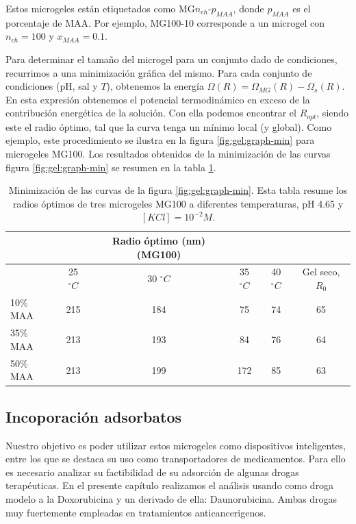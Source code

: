 Estos microgeles est\'an etiquetados como MG$n_{ch}$-$p_{MAA}$, donde $p_{MAA}$ es el porcentaje de MAA.
Por ejemplo, MG100-10 corresponde a un  microgel con $n_{ch}=100$ y $x_{MAA}=0.1$.


Para determinar el tama\~no del microgel para un conjunto dado de condiciones, recurrimos a una minimizaci\'on gr\'afica del mismo.
Para cada conjunto de condiciones (pH, sal y $T$), obtenemos la energ\'ia $\Omega(R)=\Omega_{MG}(R)-\Omega_{s}(R)$. En esta expresi\'on obtenemos el potencial termodin\'amico en exceso de la contribuci\'on energ\'etica de la soluci\'on.
Con ella podemos encontrar el $R_{opt }$, siendo este el radio \'optimo, tal que la curva tenga un m\'inimo local (y global).
Como ejemplo, este procedimiento se ilustra en la figura \ref{fig:gel:graph-min} para microgeles MG100.
Los resultados obtenidos de la minimizaci\'on de las curvas figura \ref{fig:gel:graph-min} se resumen en la tabla \ref{table:gel:optimal-R}.

\begin{table}[!htb]
\centering
\small
  \begin{tabular}{|lccccc|}
   \hline %
    	&&   Radio \'optimo (nm)(MG100) & && \\
    	\hline
      & {25 $^\circ C$} & {30 $^\circ C$} & {35 $^\circ C$} & {40 $^\circ C$} & {Gel seco, $R_0$} \\
      \hline
    10\% MAA & 215 &  184 &  75  &  74 & 65\\
    35\% MAA &  213 &  193 &  84 & 76 & 64\\
    50\% MAA &  213 & 199 &  172 & 85 & 63\\
    \hline
  \end{tabular}
 \caption{Minimizaci\'on de las curvas de la  figura \ref{fig:gel:graph-min}.
 	Esta tabla resume los radios \'optimos de tres microgeles MG100 a diferentes temperaturas, pH 4.65 y $[KCl]=10^{-2}M$.}
\label{table:gel:optimal-R} 
\end{table}


\subsection{Incoporaci\'on adsorbatos}\label{sec:gel:adsorcion}

Nuestro objetivo es poder utilizar estos microgeles como dispositivos inteligentes, entre los que se destaca su uso como transportadores de medicamentos. Para ello es necesario analizar su factibilidad de su adsorci\'on de algunas drogas terap\'euticas. En el presente cap\'itulo realizamos el an\'alisis usando como droga modelo a la Doxorubicina y un derivado de ella: Daunorubicina. Ambas drogas muy fuertemente empleadas en tratamientos anticancerigenos. 

